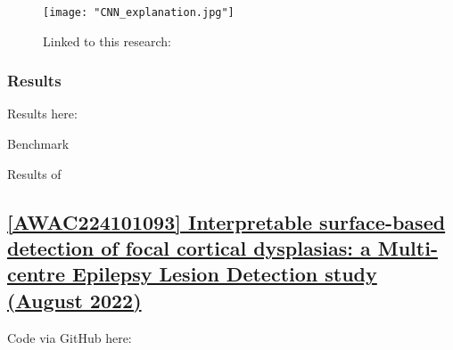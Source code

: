 \begin{figure}[htbp]
	\centering
	\texttt{[image: "CNN\_explanation.jpg"]}
	\caption{Linked to this research: }%
	\label{fig:res1}
\end{figure}

\subsubsection{Results}

Results here: 

\begin{table}[htbp]
	\centering
	\caption{Benchmark}

	\caption{Results of }%

	\caption{Best model parameter values}
	\label{tab:res1}
\end{table}

\newpage
\subsection{\href{https://academic.oup.com/brain/article/145/11/3859/6659752?login=true}{[AWAC224101093] Interpretable surface-based detection of focal cortical dysplasias: a Multi-centre Epilepsy Lesion Detection study (August 2022) }}
\label{res2}

Code via GitHub here: 

